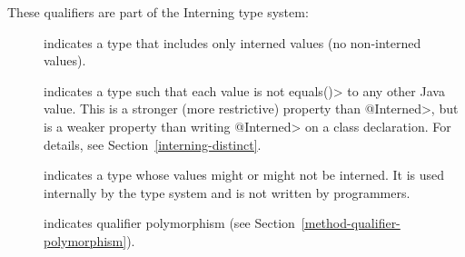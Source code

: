
These qualifiers are part of the Interning type system:

\begin{description}

\item[]
  indicates a type that includes only interned values (no non-interned
  values).

\item[]
  indicates a type such that each value is not \<equals()> to any other
  Java value.  This is a stronger (more restrictive) property than
  \<@Interned>, but is a weaker property than writing \<@Interned> on a
  class declaration.  For
  details, see Section~\ref{interning-distinct}.

\item[]
  indicates a type whose values might or might not be interned.
  It is used internally by the type system and is not written by programmers.

\item[]
  indicates qualifier polymorphism (see
  Section~\ref{method-qualifier-polymorphism}).

\end{description}


